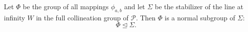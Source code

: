 Let $\Phi$ be the group of all mappings $\phi_{a,b}$ and let $\Sigma$ be the stabilizer of the line at infinity $W$ in the full collineation group of $\mathcal{P}$. Then $\Phi$ is a normal subgroup of $\Sigma$:
$$\Phi \trianglelefteq \Sigma.$$
